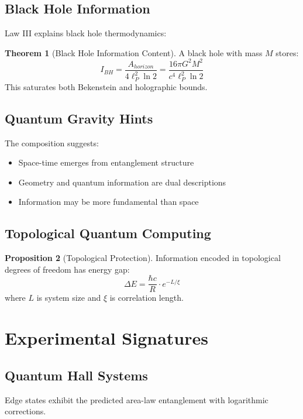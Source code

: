 \documentclass[11pt,a4paper]{article}
\theoremstyle{definition}
\newtheorem{theorem}{Theorem}[section]
\newtheorem{proposition}[theorem]{Proposition}
\begin{document}
\subsection{Black Hole Information}

Law III explains black hole thermodynamics:

\begin{theorem}[Black Hole Information Content]
A black hole with mass $M$ stores:
\begin{equation}
I_{BH} = \frac{A_{horizon}}{4\ell_P^2 \ln 2} = \frac{16\pi G^2 M^2}{c^4 \ell_P^2 \ln 2}
\end{equation}
This saturates both Bekenstein and holographic bounds.
\end{theorem}

\subsection{Quantum Gravity Hints}

The composition suggests:
\begin{itemize}
\item Space-time emerges from entanglement structure
\item Geometry and quantum information are dual descriptions
\item Information may be more fundamental than space
\end{itemize}

\subsection{Topological Quantum Computing}

\begin{proposition}[Topological Protection]
Information encoded in topological degrees of freedom has energy gap:
\begin{equation}
\Delta E = \frac{\hbar c}{R} \cdot e^{-L/\xi}
\end{equation}
where $L$ is system size and $\xi$ is correlation length.
\end{proposition}

\section{Experimental Signatures}

\subsection{Quantum Hall Systems}
Edge states exhibit the predicted area-law entanglement with logarithmic corrections.
\end{document}
